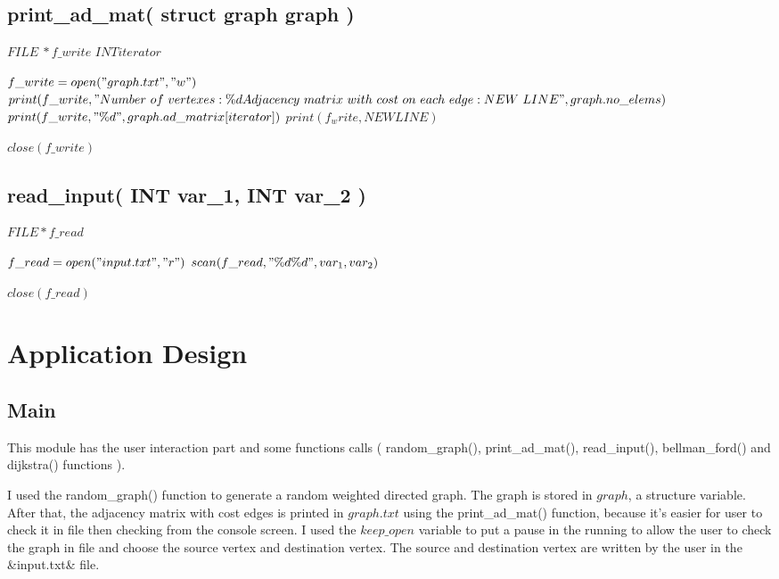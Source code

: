 \documentclass[12]{article}
\begin{document}
\subsection{print\_ad\_mat( struct graph graph )}
\begin{algorithmic}[1]

	\STATE $FILE \  *f\_write$
    \STATE $INT iterator$

    \STATE $f\_write = open("graph.txt", "w")$
    \STATE $print(f\_write, "Number\ of\ vertexes: \%d Adjacency\ matrix\ with\ cost\ on\ each\ edge: NEW\ LINE", graph.no\_elems)$
        \STATE $print(f\_write, "\%d ", graph.ad\_matrix[iterator])$
            \STATE $print(f_write, NEW LINE)$
        \ENDIF
    \ENDFOR

    \STATE $close(f\_write)$
\end{algorithmic}

\subsection{read\_input( INT var_1, INT var_2 )}
\begin{algorithmic}[1]
    \STATE $FILE *f\_read$

	\STATE $f\_read = open("input.txt", "r")$
	\STATE $scan(f\_read, "\%d\%d", var_1, var_2)$

	\STATE $close(f\_read)$
\end{algorithmic}

\newpage
\section{Application Design}
\subsection{Main}
\textbf{}

This module has the user interaction part and some functions calls ( random\_graph(), print\_ad\_mat(), read\_input(), bellman\_ford() and dijkstra() functions ).

I used the random\_graph() function to generate a random weighted directed graph. The graph is stored in $graph$, a structure variable. After that, the adjacency matrix with cost edges is printed in $graph.txt$ using the print\_ad\_mat() function, because it's easier for user to check it in file then checking from the console screen.
I used the $keep\_open$ variable to put a pause in the running to allow the user to check the graph in file and choose the source vertex and destination vertex. The source and destination vertex are written by the user in the &input.txt& file. 
\end{document}
